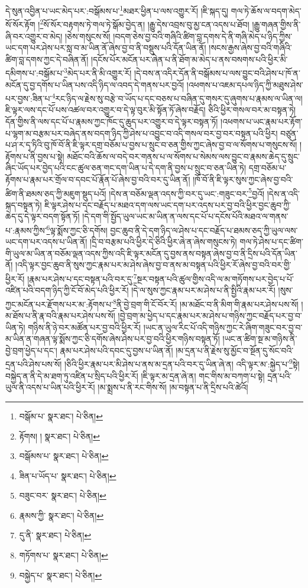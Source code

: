 དེ་སུན་འབྱིན་པ་ཡང་མེད་པར་:བསྒོམས་པ་\footnote{བསྒོམ་པ་  སྣར་ཐང་།  པེ་ཅིན། }མཐར་ཕྱིན་པ་ལས་འགྱུར་རོ། །ཇི་སྐད་དུ། གལ་ཏེ་ཆོས་ལ་བདག་མེད་སོ་སོར་རྟོག །\footnote{རྟོགས། །  སྣར་ཐང་།  པེ་ཅིན། }སོ་སོར་བརྟགས་ཏེ་གལ་ཏེ་སྒོམ་བྱེད་ན། །རྒྱུ་དེས་འབྲས་བུ་མྱ་ངན་འདས་པ་ཐོབ། །རྒྱུ་གཞན་གྱིས་ནི་ཞི་བར་འགྱུར་བ་མེད། །ཅེས་གསུངས་སོ། །བདག་ཅེས་བྱ་བའི་གཞིའི་ཚིག་བླ་དགས་དེ་ནི་གཞི་མེད་པ་ཉིད་ཀྱིས་ཡང་དག་པར་ཤེས་པར་སླ་བ་མ་ཡིན་ནོ་ཞེས་བྱ་བ་ནི་བསྡུས་པའི་དོན་ཡིན་ནོ། །སངས་རྒྱས་ཞེས་བྱ་བའི་གཞིའི་ཚིག་བླ་དགས་ཀྱང་དེ་བཞིན་ནོ། །དངོས་པོར་མངོན་པར་ཞེན་པ་ནི་ཐོག་མ་མེད་པ་ནས་བསགས་པའི་ཕྱིར་མི་དམིགས་པ་:བསྒོམ་པ་\footnote{བསྒོམས་པ་  སྣར་ཐང་།  པེ་ཅིན། }མེད་པར་ནི་མི་འགྱུར་རོ། །དེ་བས་ན་འདིར་དོན་ནི་བསྒོམས་པ་ལས་བྱུང་བའི་ཤེས་པ་ཁོ་ན་མངོན་དུ་བྱ་དགོས་པ་ཡིན་པས་འདི་ཉིད་ལ་འབད་དེ་གནས་པར་བྱའོ། །འཕགས་པ་འཇམ་དཔལ་ཉིད་ཀྱི་མཐུས་ཤེས་པར་བྱས་:ཟིན་པ་\footnote{ཟིན་པ་ཡོད་པ་  སྣར་ཐང་།  པེ་ཅིན། }རང་ཉིད་ལ་རྗེས་སུ་བརྩེ་བ་ཡོད་པ་དང་བཅས་པ་བཞིན་དུ་གསར་དུ་ཞུགས་པ་རྣམས་ལ་ཡིན་ལ། ཇི་ལྟར་ལས་དང་པོ་པས་འཚལ་བར་འགྱུར་བ་དེ་ལྟ་བུར་མི་སྟོན་ཏོ་ཞེས་བརྗོད། ཅིའི་ཕྱིར་གསལ་བར་མ་བསྟན་ཏེ། དོན་གྱིས་ནི་ལས་དང་པོ་པ་རྣམས་ཀྱང་ཁོང་དུ་ཆུད་པར་འགྱུར་བ་དེ་ལྟར་བསྟན་ཏོ། །འཕགས་པ་ཡང་རྣམ་པར་རྟོག་པ་ལྷག་མ་བརྩམ་པར་བཞེད་ནས་བདག་ཉིད་ཀྱི་ཤེས་པ་འབྱུང་བ་འདི་གསལ་བར་བྱ་བར་བསྟན་པའི་ཕྱིར། བཙུན་པ་ཤ་ར་དྭ་ཏིའི་བུ་ཁོ་བོ་ནི་ཇི་ལྟར་དགྲ་བཅོམ་པ་བྱས་པ་སྲུང་བ་ཅན་གྱིས་ཀྱང་ཞེས་བྱ་བ་ལ་སོགས་པ་གསུངས་སོ། །རྟོགས་པ་ནི་བྱས་པ་སྟེ། མཐོང་བའི་ཆོས་ལ་བདེ་བར་གནས་པ་ལ་སོགས་པ་སེམས་ལས་བྱུང་བ་རྣམས་ཆེད་དུ་སྲུང་ཞིང་ཡོད་པར་བྱེད་པའི་ངང་ཚུལ་ཅན་གང་དག་ཡིན་པ་དེ་དག་ནི་བྱས་པ་སྲུང་བ་ཅན་ཡིན་ཏེ། དགྲ་བཅོམ་པ་རྟོགས་པ་རྣམ་པར་གྲོལ་བ་དབང་པོ་རྣོན་པོ་ཞེས་བྱ་བའི་བར་དུ་ཡིན་ནོ། །ཁོ་བོ་ནི་ཇི་ལྟར་སུས་ཀྱང་ཞེས་བྱ་བའི་ཚིག་ནི་ཐམས་ཅད་ཀྱི་མཇུག་སྡུད་པའོ། །དེས་ན་བཅོམ་ལྡན་འདས་ཀྱི་བར་དུ་ཡང་:གཟུང་བར་\footnote{བཟུང་བར་  སྣར་ཐང་།  པེ་ཅིན། }བྱའོ། །དེས་ན་འདི་སྐད་བསྟན་ཏེ། ཇི་ལྟར་ཤེས་པ་དང་བརྗོད་པ་མཐའ་དག་ལས་ཡང་དག་པར་འདས་པར་བྱ་བའི་ཕྱིར་བྱང་ཆུབ་ཀྱི་ཆེད་དུ་དེ་ལྟར་བདག་སྟོན་ཏོ། །དེ་དག་གི་སྤྱོད་ཡུལ་ཡང་མ་ཡིན་ན་ལས་དང་པོ་པ་དངོས་པོའི་མཐའ་ལ་གནས་པ་:རྣམས་ཀྱིས་\footnote{རྣམས་ཀྱི་  སྣར་ཐང་།  པེ་ཅིན། }ལྟ་སྨོས་ཀྱང་ཅི་དགོས། བྱང་ཆུབ་ནི་དེ་དག་ཉིད་ལ་ཤེས་པ་དང་བརྗོད་པ་ཐམས་ཅད་ཀྱི་ཡུལ་ལས་ཡང་དག་པར་འདས་པ་ཡིན་ནོ། །དྲི་བ་བརྩམ་པའི་ཕྱིར་དེ་ཅིའི་ཕྱིར་ཞེ་ན་ཞེས་གསུངས་ཏེ། གལ་ཏེ་ཤེས་པ་དང་ཚིག་གི་ཡུལ་མ་ཡིན་ན་བཅོམ་ལྡན་འདས་ཀྱིས་འདི་ཇི་ལྟར་མངོན་དུ་བྱས་ནས་བསྟན་ཞེས་བྱ་བ་ནི་དྲིས་པའི་དོན་ཡིན་ནོ། །འདི་ལྟར་བྱང་ཆུབ་ནི་སུས་ཀྱང་རྣམ་པར་མ་ཤེས་ཞེས་བྱ་བ་ནས་མ་བསྟན་པའི་ཕྱིར་རོ་ཞེས་བྱ་བའི་བར་གྱི་ཕྱིར་རོ། །རྣམ་པར་ཤེས་པ་དང་བསྟན་པའི་བར་དུ་\footnote{དུ་ནི་  སྣར་ཐང་།  པེ་ཅིན། }སྔར་བསྟན་པའི་ཚུལ་གྱིས་འདི་ལ་མ་གཏོགས་པར་བྱེད་པ་པོ་འཛིན་པའི་བདག་ཉིད་ཀྱི་ངོ་བོ་མེད་པའི་ཕྱིར་རོ། །དེ་ལ་སུས་ཀྱང་རྣམ་པར་མ་ཤེས་པ་ནི་སྤྱིའི་རྣམ་པར་རོ། །སུས་ཀྱང་མངོན་པར་རྫོགས་པར་མ་:རྟོགས་པ་\footnote{གཏོགས་པ་  སྣར་ཐང་།  པེ་ཅིན། }ནི་བྱེ་བྲག་གི་ངོ་བོར་རོ། །མ་མཐོང་བ་ནི་མིག་གི་རྣམ་པར་ཤེས་པས་སོ། །མ་ཐོས་པ་ནི་རྣ་བའི་རྣམ་པར་ཤེས་པས་སོ། །བྱེ་བྲག་མ་ཕྱེད་པ་དང་རྣམ་པར་མ་ཤེས་པ་གཉིས་ཀྱང་བརྗོད་པར་བྱ་བ་ཡིན་ཏེ། གཉིས་ནི་ཉེ་བར་མཚོན་པར་བྱ་བའི་ཕྱིར་རོ། །ཡང་ན་ཡུལ་རིང་པོ་འདི་གཉིས་ཀྱང་རེ་ཞིག་གཟུང་བར་བྱ་བ་མ་ཡིན་ན་གཞན་ལྟ་སྨོས་ཀྱང་ཅི་དགོས་ཞེས་ཤེས་པར་བྱ་བའི་ཕྱིར་གཉིས་བསྟན་ཏོ། །ཡང་ན་ཚིག་སྔ་མ་གཉིས་ནི་བྱེ་བྲག་ཕྱེད་པ་དང་། རྣམ་པར་ཤེས་པའི་དབང་དུ་བྱས་པ་ཡིན་ནོ། །མ་དྲན་པ་ནི་རྗེས་སུ་མྱོང་བ་སྔོན་དུ་སོང་བའི་དྲན་པའི་ཤེས་པས་སོ། །ཅིའི་ཕྱིར་རྣམ་པར་མི་ཤེས་པ་ནས་མ་དྲན་པའི་བར་དུ་ཡིན་ཞེ་ན། འདི་ལྟར་མ་:སྐྱེད་པ་\footnote{བསྐྱེད་པ་  སྣར་ཐང་།  པེ་ཅིན། }སྟེ། བསྐྱེད་ན་ནི་དེ་མ་ཐག་ཏུ་འཛིན་པ་སྲིད་པའི་ཕྱིར་རོ། །ཇི་ལྟར་མ་དྲན་ཞེ་ན། གང་གིས་མ་བཀག་པ་སྟེ། དྲན་པའི་ཡུལ་ནི་འདས་པ་ཡིན་པའི་ཕྱིར་རོ། །མ་སྨྲས་པ་ནི་རང་གིས་སོ། །མ་བསྟན་པ་ནི་དྲིས་པའི་ཚེའོ། 
